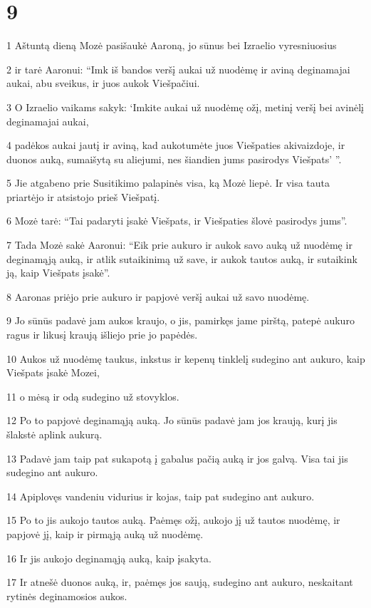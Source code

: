 \chapter{9}


\par 1 Aštuntą dieną Mozė pasišaukė Aaroną, jo sūnus bei Izraelio vyresniuosius 
\par 2 ir tarė Aaronui: “Imk iš bandos veršį aukai už nuodėmę ir aviną deginamajai aukai, abu sveikus, ir juos aukok Viešpačiui. 
\par 3 O Izraelio vaikams sakyk: ‘Imkite aukai už nuodėmę ožį, metinį veršį bei avinėlį deginamajai aukai, 
\par 4 padėkos aukai jautį ir aviną, kad aukotumėte juos Viešpaties akivaizdoje, ir duonos auką, sumaišytą su aliejumi, nes šiandien jums pasirodys Viešpats’ ”. 
\par 5 Jie atgabeno prie Susitikimo palapinės visa, ką Mozė liepė. Ir visa tauta priartėjo ir atsistojo prieš Viešpatį. 
\par 6 Mozė tarė: “Tai padaryti įsakė Viešpats, ir Viešpaties šlovė pasirodys jums”. 
\par 7 Tada Mozė sakė Aaronui: “Eik prie aukuro ir aukok savo auką už nuodėmę ir deginamąją auką, ir atlik sutaikinimą už save, ir aukok tautos auką, ir sutaikink ją, kaip Viešpats įsakė”. 
\par 8 Aaronas priėjo prie aukuro ir papjovė veršį aukai už savo nuodėmę. 
\par 9 Jo sūnūs padavė jam aukos kraujo, o jis, pamirkęs jame pirštą, patepė aukuro ragus ir likusį kraują išliejo prie jo papėdės. 
\par 10 Aukos už nuodėmę taukus, inkstus ir kepenų tinklelį sudegino ant aukuro, kaip Viešpats įsakė Mozei, 
\par 11 o mėsą ir odą sudegino už stovyklos. 
\par 12 Po to papjovė deginamąją auką. Jo sūnūs padavė jam jos kraują, kurį jis šlakstė aplink aukurą. 
\par 13 Padavė jam taip pat sukapotą į gabalus pačią auką ir jos galvą. Visa tai jis sudegino ant aukuro. 
\par 14 Apiplovęs vandeniu vidurius ir kojas, taip pat sudegino ant aukuro. 
\par 15 Po to jis aukojo tautos auką. Paėmęs ožį, aukojo jį už tautos nuodėmę, ir papjovė jį, kaip ir pirmąją auką už nuodėmę. 
\par 16 Ir jis aukojo deginamąją auką, kaip įsakyta. 
\par 17 Ir atnešė duonos auką, ir, paėmęs jos saują, sudegino ant aukuro, neskaitant rytinės deginamosios aukos. 
